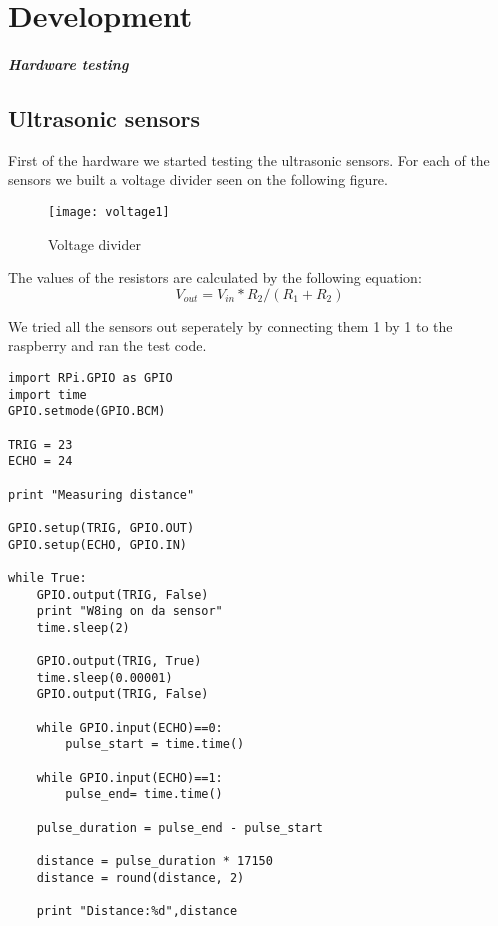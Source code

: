 \chapter{Development}\label{ch:development}

\paragraph{Hardware testing} 

\section{Ultrasonic sensors}

First of the hardware we started testing the ultrasonic sensors.
For each of the sensors we built a voltage divider seen on the following figure.

\begin{figure}[h]
\centering
\texttt{[image: voltage1]}
\caption{Voltage divider}
\label{fig::voltage1}
\end{figure}

The values of the resistors are calculated by the following equation:
\begin{equation} \label{voltagedivider} 
{V}_{out}={V}_{in}*{R}_{2}/({R}_{1}+{R}_{2})
\end{equation}

We tried all the sensors out seperately by connecting them 1 by 1 to the raspberry and ran the test code.

\begin{lstlisting}
import RPi.GPIO as GPIO
import time
GPIO.setmode(GPIO.BCM)

TRIG = 23
ECHO = 24

print "Measuring distance"

GPIO.setup(TRIG, GPIO.OUT)
GPIO.setup(ECHO, GPIO.IN)

while True:
	GPIO.output(TRIG, False)
	print "W8ing on da sensor"
	time.sleep(2)

	GPIO.output(TRIG, True)
	time.sleep(0.00001)
	GPIO.output(TRIG, False)

	while GPIO.input(ECHO)==0:
		pulse_start = time.time()

	while GPIO.input(ECHO)==1:
		pulse_end= time.time()

	pulse_duration = pulse_end - pulse_start

	distance = pulse_duration * 17150
	distance = round(distance, 2)

	print "Distance:%d",distance

\end{lstlisting}


